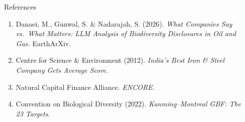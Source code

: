 \documentclass[final]{beamer}
\newlength{\sepwidth}
\newlength{\colwidth}
\newcommand{\separatorcolumn}{\begin{column}{\sepwidth}\end{column}}
\begin{document}
\begin{frame}[t]
\begin{columns}[t]
\begin{column}{\colwidth}
  \begin{block}{References}
    {\small
    \begin{enumerate}\setlength{\itemsep}{0.1ex}
      \item Danaei, M., Gunwal, S. \& Nadarajah, S. (2026). \emph{What Companies
        Say vs.\ What Matters: LLM Analysis of Biodiversity Disclosures in Oil
        and Gas.} EarthArXiv.
      \item Centre for Science \& Environment (2012). \emph{India's Best Iron \&
        Steel Company Gets Average Score.}
      \item Natural Capital Finance Alliance. \emph{ENCORE.}
      \item Convention on Biological Diversity (2022). \emph{Kunming--Montreal
        GBF: The 23 Targets.}
    \end{enumerate}}
  \end{block}

\end{column}

\separatorcolumn
\end{columns}
\end{frame}
\end{document}
